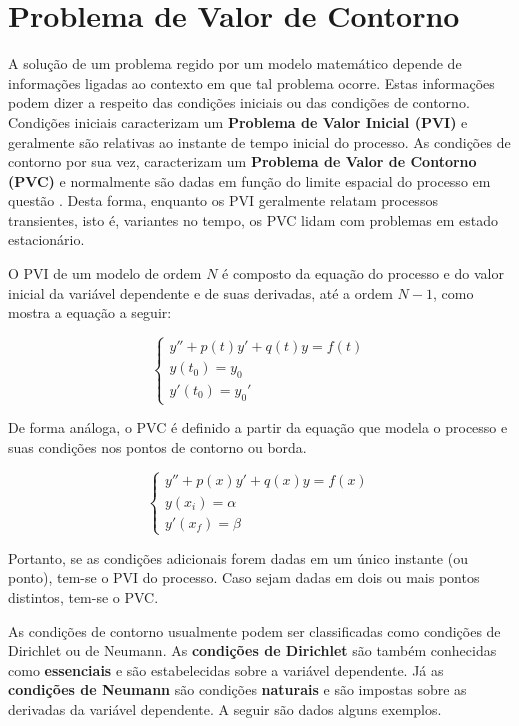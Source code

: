 \section{Problema de Valor de Contorno}


A solução de um problema regido por um modelo matemático depende de informações ligadas ao contexto em que tal problema ocorre.
Estas informações podem dizer a respeito das condições iniciais ou das condições de contorno. 
Condições iniciais caracterizam um \textbf{Problema de Valor Inicial (PVI)} e geralmente são relativas ao instante de tempo inicial do processo.
As condições de contorno por sua vez, caracterizam um \textbf{Problema de Valor de Contorno (PVC)} e  normalmente são dadas em função do limite espacial do processo em questão
\citep[p. 447]{boyce_diprima}.
Desta forma, enquanto os PVI geralmente relatam processos transientes, isto é, variantes no tempo, os PVC lidam com problemas em estado estacionário.

O PVI de um modelo de ordem $N$ é composto da equação do processo e do valor inicial da variável dependente e de suas derivadas, até a ordem $N-1$, como mostra a equação a seguir:

\begin{equation}
	\begin{cases}
		y'' + p(t)y' + q(t)y = f(t) \\
		y(t_0) = y_0 \\
		y'(t_0) = y_0'
	\end{cases}
\end{equation}

De forma análoga, o PVC é definido a partir da equação que modela o processo e suas condições nos pontos de contorno ou borda.

\begin{equation}
	\begin{cases}
		y'' + p(x)y' + q(x)y = f(x) \\
		y(x_i) = \alpha \\
		y'(x_f) = \beta
	\end{cases}
\end{equation}

Portanto, se as condições adicionais forem dadas em um único instante (ou ponto), tem-se o PVI do processo. Caso sejam dadas em dois ou mais pontos distintos, tem-se o PVC.

As condições de contorno usualmente podem ser classificadas como condições de Dirichlet ou de Neumann. 
As \textbf{condições de Dirichlet} são também conhecidas como \textbf{essenciais} e são estabelecidas sobre a variável dependente. Já as \textbf{condições de Neumann} são condições \textbf{naturais} e são impostas sobre as derivadas da variável dependente. A seguir são dados alguns exemplos.

